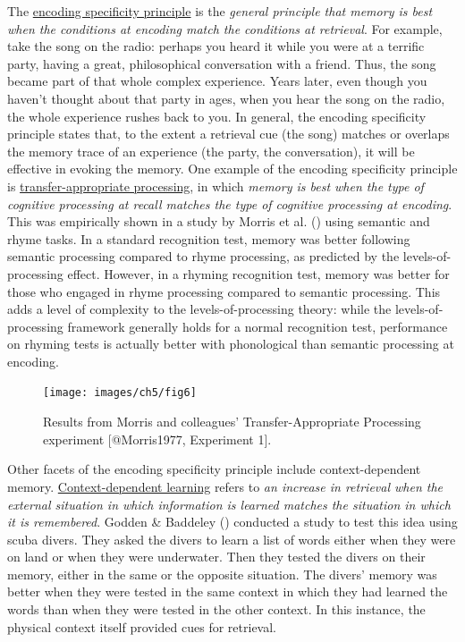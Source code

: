 \documentclass[
]{krantz}
\begin{document}
The \hyperref[encoding-specificity-principle]{encoding specificity principle} is the \emph{general principle that memory is best when the conditions at encoding match the conditions at retrieval}. For example, take the song on the radio: perhaps you heard it while you were at a terrific party, having a great, philosophical conversation with a friend. Thus, the song became part of that whole complex experience. Years later, even though you haven't thought about that party in ages, when you hear the song on the radio, the whole experience rushes back to you. In general, the encoding specificity principle states that, to the extent a retrieval cue (the song) matches or overlaps the memory trace of an experience (the party, the conversation), it will be effective in evoking the memory. One example of the encoding specificity principle is \hyperref[transfer-appropriate-processing]{transfer-appropriate processing}, in which \emph{memory is best when the type of cognitive processing at recall matches the type of cognitive processing at encoding}. This was empirically shown in a study by Morris et al. () using semantic and rhyme tasks. In a standard recognition test, memory was better following semantic processing compared to rhyme processing, as predicted by the levels-of-processing effect. However, in a rhyming recognition test, memory was better for those who engaged in rhyme processing compared to semantic processing. This adds a level of complexity to the levels-of-processing theory: while the levels-of-processing framework generally holds for a normal recognition test, performance on rhyming tests is actually better with phonological than semantic processing at encoding.

\begin{figure}

{\centering \texttt{[image: images/ch5/fig6]} 

}

\caption{Results from Morris and colleagues’ Transfer-Appropriate Processing experiment [@Morris1977, Experiment 1].}\label{fig:morris}
\end{figure}

Other facets of the encoding specificity principle include context-dependent memory. \hyperref[context-dependent-learning]{Context-dependent learning} refers to \emph{an increase in retrieval when the external situation in which information is learned matches the situation in which it is remembered}. Godden \& Baddeley () conducted a study to test this idea using scuba divers. They asked the divers to learn a list of words either when they were on land or when they were underwater. Then they tested the divers on their memory, either in the same or the opposite situation. The divers' memory was better when they were tested in the same context in which they had learned the words than when they were tested in the other context. In this instance, the physical context itself provided cues for retrieval.
\end{document}
